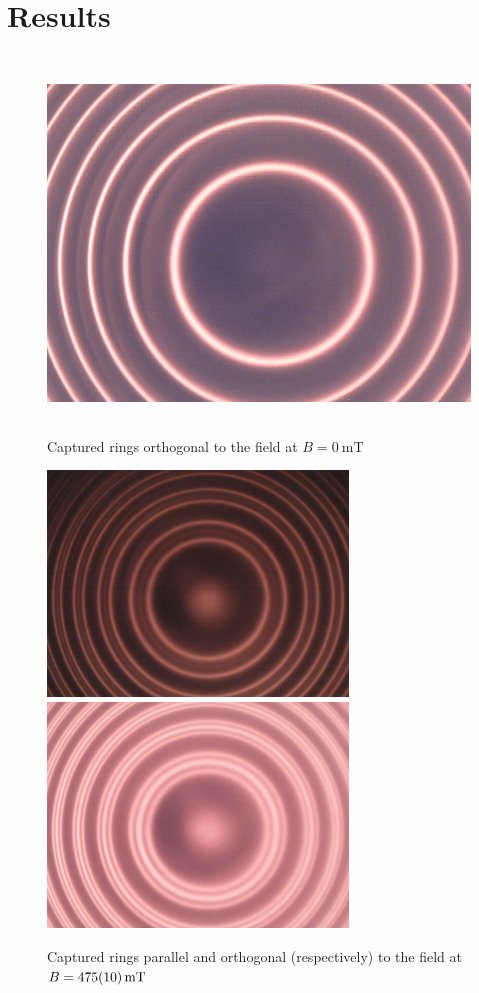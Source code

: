 \documentclass[a4paper]{scrartcl}
\begin{document}
\section{Results}
\begin{figure}
    \centering
    \includegraphics[height = 10cm]{data/0mT-orth.png}
    \caption{Captured rings orthogonal to the field at \(B = \SI{0}{\milli\tesla}\)}
    \label{fig:zero-rings}
\end{figure}
\begin{figure}
    \centering
    \includegraphics[width = 8cm]{data/475+-10mT-parr.png}
    \includegraphics[width = 8cm]{data/475+-10mT-orth.png}
    \caption{Captured rings parallel and orthogonal (respectively) to the field at \(B = \SI{475 \pm 10}{\milli\tesla}\)}
    \label{fig:zeeman-rings}
\end{figure}
\end{document}
